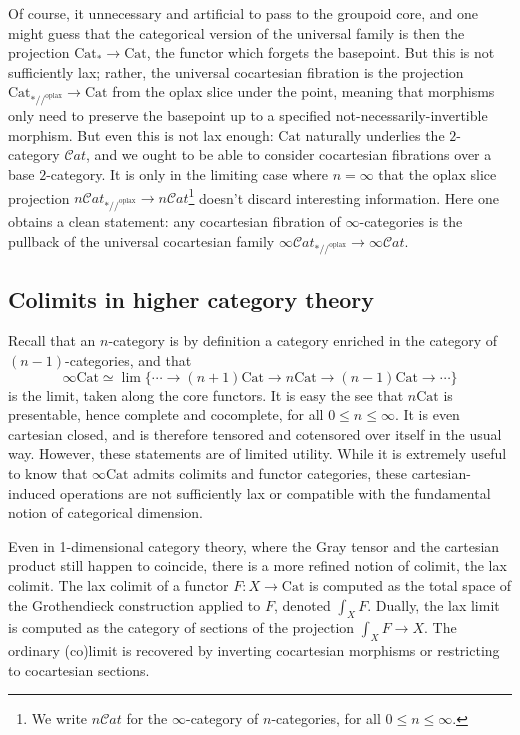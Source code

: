 \documentclass[10pt,oneside]{article}
\numberwithin{equation}{section} %
\numberwithin{figure}{section} %
\theoremstyle{plain}
\theoremstyle{definition}
\newcommand{\Cat}{\mathrm{Cat}}
\newcommand{\oplax}{{\mathrm{oplax}}}
\newcommand{\scat}{\mathcal{C}\mathit{at}}
\begin{document}
Of course, it unnecessary and artificial to pass to the groupoid core, 
and one might guess that the categorical version of the universal family is then the projection $\Cat_*\to\Cat$, the functor which forgets the basepoint.
But this is not sufficiently lax; rather, the universal cocartesian fibration is the projection $\Cat_{\ast//^\oplax}\to\Cat$ from the oplax slice under the point, meaning that morphisms only need to preserve the basepoint up to a specified not-necessarily-invertible morphism.
But even this is not lax enough: $\Cat$ naturally underlies the $2$-category $\scat$, and we ought to be able to consider cocartesian fibrations over a base $2$-category.
It is only in the limiting case where $n=\infty$ that the oplax slice projection $n\scat_{*//^\oplax}\to n\scat$\footnote{We write $n\scat$ for the $\infty$-category of $n$-categories, for all $0\leq n\leq\infty$.} doesn't discard interesting information.
Here one obtains a clean statement: any cocartesian fibration of $\infty$-categories is the pullback of the universal cocartesian family $\infty\scat_{\ast//^\oplax}\to\infty\scat$.



\subsection{Colimits in higher category theory}
Recall that an $n$-category is by definition a category enriched in the category of $(n-1)$-categories, and that
\[
\infty\Cat\simeq\lim\{\cdots\to (n+1)\Cat\to n\Cat\to (n-1)\Cat\to\cdots\}
\]
is the limit, taken along the core functors.
It is easy the see that $n\Cat$ is presentable, hence complete and cocomplete, for all $0\leq n\leq\infty$.
It is even cartesian closed, and is therefore tensored and cotensored over itself in the usual way.
However, these statements are of limited utility.
While it is extremely useful to know that $\infty\Cat$ admits colimits and functor categories, these cartesian-induced operations are not sufficiently lax or compatible with the fundamental notion of categorical dimension.


Even in 1-dimensional category theory, where the Gray tensor and the cartesian product still happen to coincide, there is a more refined notion of colimit, the lax colimit.
The lax colimit of a functor $F:X\to\Cat$ is computed as the total space of the Grothendieck construction applied to $F$, denoted $\int_X F$.
Dually, the lax limit is computed as the category of sections of the projection $\int_X F\to X$.
The ordinary (co)limit is recovered by inverting cocartesian morphisms or restricting to cocartesian sections.
\end{document}
